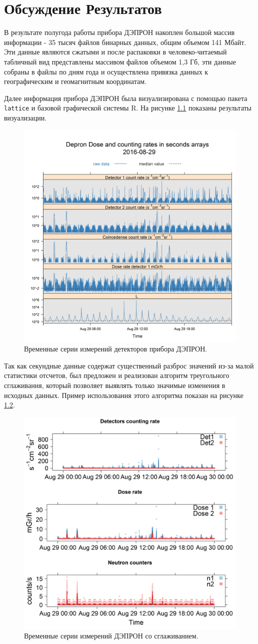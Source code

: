 
\chapter{Обсуждение Результатов}\label{chapt_results}
В результате полугода работы прибора ДЭПРОН накоплен большой массив информации - 35 тысяч файлов бинарных данных, общим объемом 141 Мбайт. Эти данные являются сжатыми и после распаковки в человеко-читаемый табличный вид представлены массивом файлов объемом 1,3 Гб, эти данные собраны в файлы по дням года и осуществлена привязка данных к географическим и геомагнитным координатам.



Далее информация прибора ДЭПРОН была визуализирована с помощью пакета \texttt{lattice} и базовой графической системы R. На рисунке \ref{fig:depronseclog08-29-16} показаны результаты визуализации.
\begin{figure}[h]
	\centering
	\includegraphics[width=0.5\linewidth]{images/results/depron_sec_log08-29-16}
	\caption{Временные серии  измерений детекторов прибора ДЭПРОН. }
	\label{fig:depronseclog08-29-16}
\end{figure}
Так как секундные данные содержат существенный разброс значений из-за малой статистики отсчетов, был предложен и реализован алгоритм треугольного сглаживания, который позволяет выявлять только значимые изменения в исходных данных. Пример использования этого алгоритма показан на рисунке 	\ref{fig:depronseclognew08-29-16}.
\begin{figure}
	\centering
	\includegraphics[width=0.5\linewidth]{images/results/depron_sec_log_new08-29-16}
	\caption{Временные серии измерений ДЭПРОН со сглаживанием. }
	\label{fig:depronseclognew08-29-16}
\end{figure}
